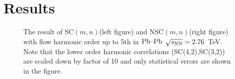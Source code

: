 \documentclass[ALICE,manyauthors]{cernphprep}
\begin{document}

% 

\section{Results}
\label{sec:results}

\begin{figure}[htbp]
            \begin{center}
        \caption{The result of SC$(m,n)$(left figure) and NSC$(m,n)$(right figure) with flow harmonic order up to 5th in $\textnormal{Pb--Pb}$ $\sqrt{s_{\textnormal{NN}}}=2.76$~TeV. Note that the lower order harmonic correlations (SC(4,2),SC(3,2)) are scaled down by factor of 10 and only statistical errors are shown in the figure.}
        \label{fig:Figure_1}
              \end{center}
\end{figure}
\end{document}
